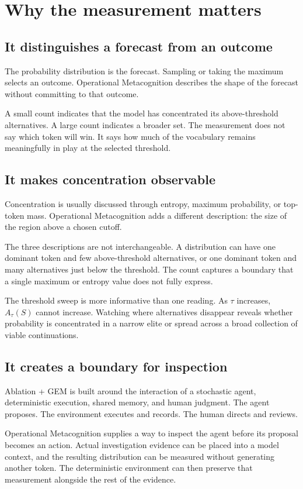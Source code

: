 \documentclass[11pt,a4paper]{article}
\begin{document}
\section{Why the measurement matters}
\subsection{It distinguishes a forecast from an outcome}
The probability distribution is the forecast. Sampling or taking the maximum selects an outcome. Operational Metacognition describes the shape of the forecast without committing to that outcome.

A small count indicates that the model has concentrated its above-threshold alternatives. A large count indicates a broader set. The measurement does not say which token will win. It says how much of the vocabulary remains meaningfully in play at the selected threshold.

\subsection{It makes concentration observable}
Concentration is usually discussed through entropy, maximum probability, or top-token mass. Operational Metacognition adds a different description: the size of the region above a chosen cutoff.

The three descriptions are not interchangeable. A distribution can have one dominant token and few above-threshold alternatives, or one dominant token and many alternatives just below the threshold. The count captures a boundary that a single maximum or entropy value does not fully express.

The threshold sweep is more informative than one reading. As $\tau$ increases, $A_\tau(S)$ cannot increase. Watching where alternatives disappear reveals whether probability is concentrated in a narrow elite or spread across a broad collection of viable continuations.

\subsection{It creates a boundary for inspection}
Ablation + GEM is built around the interaction of a stochastic agent, deterministic execution, shared memory, and human judgment. The agent proposes. The environment executes and records. The human directs and reviews.

Operational Metacognition supplies a way to inspect the agent before its proposal becomes an action. Actual investigation evidence can be placed into a model context, and the resulting distribution can be measured without generating another token. The deterministic environment can then preserve that measurement alongside the rest of the evidence.
\end{document}
